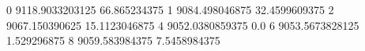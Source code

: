 0 9118.9033203125 66.865234375
1 9084.498046875 32.4599609375
2 9067.150390625 15.1123046875
4 9052.0380859375 0.0
6 9053.5673828125 1.529296875
8 9059.583984375 7.5458984375
